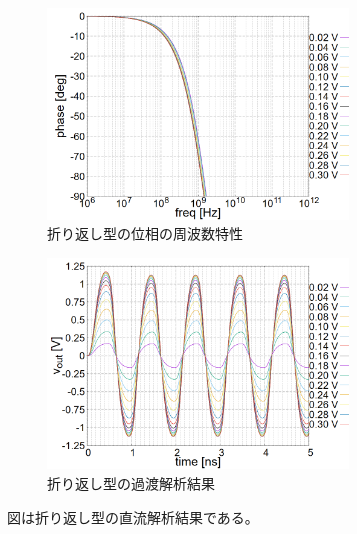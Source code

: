 \documentclass[twocolumn]{jsarticle}
\begin{document}
    \begin{figure}[H]
        \begin{center}
            \includegraphics*[width = 80mm]{figures/NtoN_ac_phase.PNG}
            \caption{折り返し型の位相の周波数特性}
            \label{fig:sim_NtoN_ac_phase}
        \end{center}
    \end{figure}
    \begin{figure}[H]
        \begin{center}
            \includegraphics*[width = 80mm]{figures/NtoN_tr.PNG}
            \caption{折り返し型の過渡解析結果}
            \label{fig:sim_NtoN_tr}
        \end{center}
    \end{figure}
    図は折り返し型の直流解析結果である。
\end{document}
